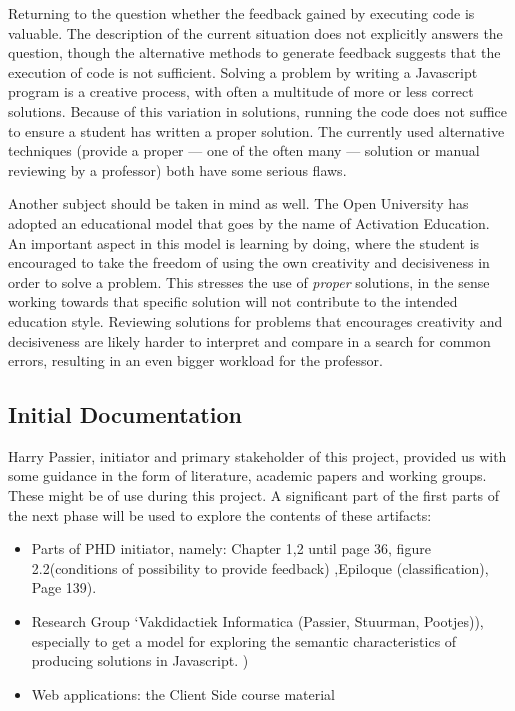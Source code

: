 \documentclass{article}
\begin{document}
Returning to the question whether the feedback gained by executing code is valuable. The description of the current situation does not explicitly answers the question, though the alternative methods to generate feedback suggests that the execution of code is not sufficient. Solving a problem by writing a Javascript program is a creative process, with often a multitude of more or less correct solutions. Because of this variation in solutions, running the code does not suffice to ensure a student has written a proper solution. The currently used alternative techniques (provide a proper --- one of the often many --- solution or manual reviewing by a professor) both have some serious flaws. 

Another subject should be taken in mind as well. The Open University has adopted an educational model that goes by the name of Activation Education. An important aspect in this model is learning by doing, where the student is encouraged to take the freedom of using the own creativity and decisiveness in order to solve a problem. This stresses the use of {\em proper} solutions, in the sense working towards that specific solution will not contribute to the intended education style. Reviewing solutions for problems that encourages creativity and decisiveness are likely harder to interpret and compare in a search for common errors, resulting in an even bigger workload for the professor. 

\subsection{Initial Documentation}

Harry Passier, initiator and primary stakeholder of this project, provided us with some guidance in the form of literature, academic papers and working groups. These might be of use during this project. A significant part of the first parts of the next phase will be used to explore the contents of these artifacts:
\begin{itemize}
  \item Parts of PHD initiator, namely: Chapter 1,2 until page 36, figure 2.2(conditions of possibility to provide feedback) ,Epiloque (classification), Page 139).
  \item Research Group ‘Vakdidactiek Informatica (Passier, Stuurman, Pootjes)), especially to get a model for exploring the semantic characteristics of producing solutions in Javascript. )
  \item Web applications: the Client Side course material
\end{itemize}
\end{document}
